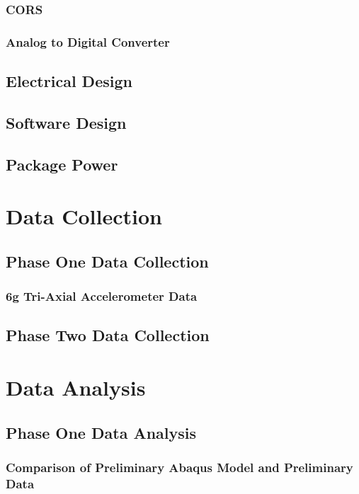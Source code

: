 \documentclass[12pt]{report}
\begin{document}
		\subsection{CORS}
		\subsection{Analog to Digital Converter}
			
	\section{Electrical Design}
			
	\section{Software Design}
		
	\section{Package Power}
		
		
\chapter{Data Collection}
\label{ch:DataCollection}
	\section{Phase One Data Collection}
		\subsection{6g Tri-Axial Accelerometer Data}
			
	\section{Phase Two Data Collection}
			
			
			
			
			
		
\chapter{Data Analysis}
\label{ch:DataAnalysis}
	\section{Phase One Data Analysis}
		\subsection{Comparison of Preliminary Abaqus Model and Preliminary Data}
			
\end{document}
